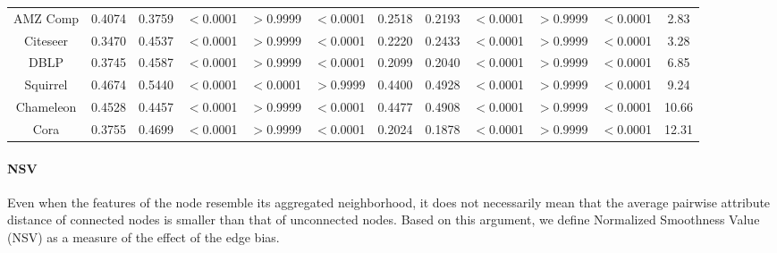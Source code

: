\documentclass{article}
\newcommand{\0}{{\boldsymbol{0}}}
\newcommand{\6}{{\partial}}
\newcommand{\8}{{\infty}}
\newcommand{\4}{{\nabla}}
\begin{document}
\begin{table*}[htbp]
{\begin{tabular}{c|cc|ccc|cc|ccc|c}
    AMZ Comp & 0.4074 & 0.3759 & $<$0.0001     & $>$0.9999     & $<$0.0001     & 0.2518 & 0.2193 & $<$0.0001     & $>$0.9999     & $<$0.0001    & \textcolor[rgb]{ 0,  .69,  .314}{2.83} \\
    Citeseer & 0.3470 & 0.4537 & $<$0.0001     & $>$0.9999     & $<$0.0001     & 0.2220 & 0.2433 & $<$0.0001     & $>$0.9999     & $<$0.0001     & \textcolor[rgb]{ 0,  .69,  .314}{3.28} \\
    DBLP  & 0.3745 & 0.4587 & $<$0.0001     & $>$0.9999    & $<$0.0001     & 0.2099 & 0.2040 & $<$0.0001     & $>$0.9999    & $<$0.0001     & \textcolor[rgb]{ 0,  .69,  .314}{6.85} \\
    Squirrel & 0.4674 & 0.5440 & $<$0.0001     & $<$0.0001     & $>$0.9999     & 0.4400 & 0.4928 & $<$0.0001    & $>$0.9999     & $<$0.0001     & \textcolor[rgb]{ 0,  .69,  .314}{9.24} \\
    Chameleon & 0.4528 & 0.4457 & $<$0.0001     & $>$0.9999    & $<$0.0001     & 0.4477 & 0.4908 & $<$0.0001     & $>$0.9999    & $<$0.0001     & \textcolor[rgb]{ 0,  .69,  .314}{10.66} \\
    Cora  & 0.3755 & 0.4699 & $<$0.0001     & $>$0.9999    & $<$0.0001     & 0.2024 & 0.1878 & $<$0.0001     & $>$0.9999    & $<$0.0001    & \textcolor[rgb]{ 0,  .69,  .314}{12.31} \\
    \bottomrule
    \bottomrule
    \end{tabular}}
  \label{tab:stats}\end{table*}%
\paragraph{NSV} 
Even when the features of the node resemble its aggregated neighborhood, it does not necessarily mean that the average pairwise attribute distance of connected nodes is smaller than that of unconnected nodes. Based on this argument, we define Normalized Smoothness Value (NSV) as a measure of the effect of the edge bias.
\end{document}
